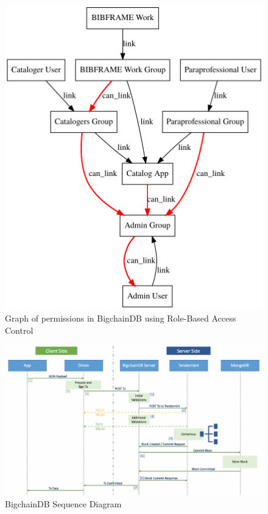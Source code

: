\begin{figure}[!htb]
	\centering\includegraphics[width=\columnwidth]{images/rbac-graph.pdf}  
	\caption{Graph of permissions in BigchainDB using Role-Based Access 
	Control}\label{f:rbac}
\end{figure}

\begin{figure}[!htb]
	\centering\includegraphics[width=\columnwidth]{images/bdb-seq.pdf}  
	\caption{BigchainDB Sequence Diagram~\cite{aA17}}\label{f:bdb1}
\end{figure}

